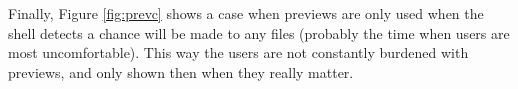 Finally, Figure \ref{fig:prevc} shows a case when previews are only used when
the shell detects a chance will be made to any files (probably the time when
users are most uncomfortable). This way the users are not constantly burdened
with previews, and only shown then when they really matter.

